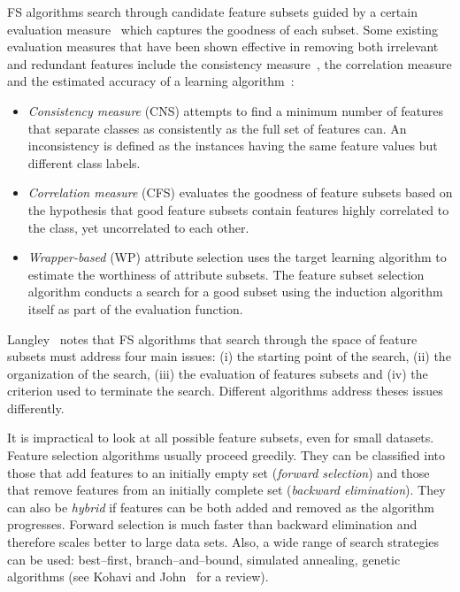 \documentclass{elsart}
\begin{document}


FS algorithms search through candidate feature subsets guided by a certain evaluation measure~\cite{LM98} which captures the goodness of each subset. Some existing evaluation measures that have been shown effective in removing both irrelevant and redundant features include the consistency measure~\cite{DLM00}, the correlation measure \cite{Hall99CFSThesis} and the estimated accuracy of a learning algorithm~\cite{KJ97}:

\begin{itemize}
\item \emph{Consistency measure} (CNS) attempts to find a minimum number of features that separate classes as consistently as the full set of features can. An inconsistency is defined as the instances having the same feature values but different class labels.

\item \emph{Correlation measure} (CFS) evaluates the goodness of feature subsets based on the hypothesis that good feature subsets contain features highly correlated to the class, yet uncorrelated to each other.

\item \emph{Wrapper-based} (WP) attribute selection uses the target learning algorithm to estimate the worthiness of attribute subsets. The feature subset selection algorithm conducts a search for a good subset using the induction algorithm itself as part of the evaluation function.

\end{itemize}


Langley~\cite{Lan94} notes that FS algorithms that search through the space of feature subsets must address four main issues: (i) the starting point of the search, (ii) the organization of the search, (iii) the evaluation of features subsets and (iv) the criterion used to terminate the search. Different algorithms address theses issues differently.

It is impractical to look at all possible feature subsets, even for small datasets. Feature selection algorithms usually proceed
greedily. They can be classified into those that add features to an initially empty set (\emph{forward selection}) and those that remove features from an initially complete set (\emph{backward elimination}). They can also be \emph{hybrid} if features can be
both added and removed as the algorithm progresses. Forward selection is much faster than backward elimination and therefore
scales better to large data sets. Also, a wide range of search strategies can be used: best--first, branch--and--bound, simulated
annealing, genetic algorithms (see Kohavi and John~\cite{KJ97} for a review).
\end{document}
